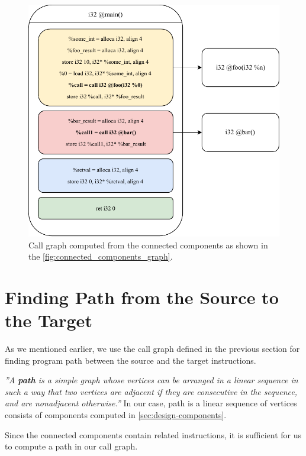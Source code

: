 \documentclass[12pt, twoside]{fithesis2}
\renewcommand{\_}{\leavevmode \kern0.07em\vbox{\hrule width0.4em}}
\begin{document}
\begin{figure}[ht]
    \centering
    \includegraphics[]{images/main_callgraph.pdf}
    \caption{Call graph computed from the connected components
    as shown in the \autoref{fig:connected_components_graph}.}
    \label{fig:call_graph}
\end{figure}


\section{Finding Path from the Source to the Target}
\label{sec:design-path}

As we mentioned earlier, we use the call graph defined in the previous section
for finding program path between the source and the target instructions.


\emph{''A \textbf{path} is a simple graph whose vertices can be arranged in a linear sequence in
such a way that two vertices are adjacent if they are consecutive in the sequence,
and are nonadjacent otherwise.''}\cite{graph_theory} In our case, path is
a linear sequence of vertices consists of components computed in
\autoref{sec:design-components}.

Since the connected components contain related instructions, it is sufficient
for us to compute a path in our call graph.
\end{document}

